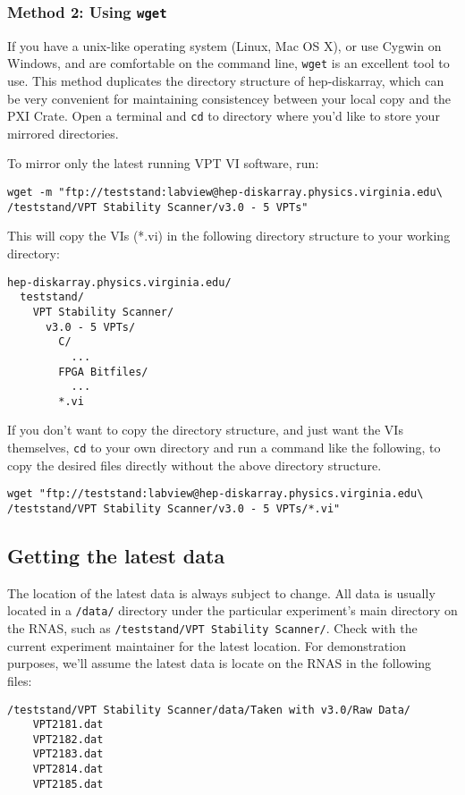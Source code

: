 \subsubsection{Method 2: Using \texttt{wget}}
\label{sec:op_start:vptvi:wget}

If you have a unix-like operating system (Linux, Mac OS X), or use Cygwin on Windows, and are comfortable on the command line, \texttt{wget} is an excellent tool to use.  This method duplicates the directory structure of hep-diskarray, which can be very convenient for maintaining consistencey between your local copy and the \gls{PXI Crate}.  Open a terminal and \texttt{cd} to directory where you'd like to store your mirrored directories.

To mirror only the latest running \gls{VPT VI} software, run:
\begin{verbatim}
wget -m "ftp://teststand:labview@hep-diskarray.physics.virginia.edu\
/teststand/VPT Stability Scanner/v3.0 - 5 VPTs"
\end{verbatim}

This will copy the VIs (*.vi) in the following directory structure to your working directory:
\begin{verbatim}
hep-diskarray.physics.virginia.edu/
  teststand/
    VPT Stability Scanner/
      v3.0 - 5 VPTs/
        C/
          ...
        FPGA Bitfiles/
          ...
        *.vi
\end{verbatim}

If you don't want to copy the directory structure, and just want the VIs themselves, \texttt{cd} to your own directory and run a command like the following, to copy the desired files directly without the above directory structure.
\begin{verbatim}
wget "ftp://teststand:labview@hep-diskarray.physics.virginia.edu\
/teststand/VPT Stability Scanner/v3.0 - 5 VPTs/*.vi"
\end{verbatim}

\subsection{Getting the latest data}
\label{sec:op_start:data}

The location of the latest data is always subject to change.  All data is usually located in a \texttt{/data/} directory under the particular experiment's main directory on the RNAS, such as \texttt{/teststand/VPT Stability Scanner/}.  Check with the current experiment maintainer for the latest location.  For demonstration purposes, we'll assume the latest data is locate on the RNAS in the following files:\\
\begin{verbatim}
/teststand/VPT Stability Scanner/data/Taken with v3.0/Raw Data/
    VPT2181.dat
    VPT2182.dat
    VPT2183.dat
    VPT2814.dat
    VPT2185.dat
\end{verbatim}

